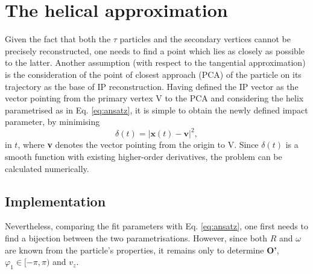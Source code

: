 \section{The helical approximation}
Given the fact that both the $\tau$ particles and the secondary vertices cannot be precisely reconstructed, one needs to find a point which lies as closely as possible to the latter. Another assumption (with respect to the tangential approximation) is the consideration of the point of closest approach (PCA) of the particle on its trajectory as the base of IP reconstruction. Having defined the IP vector as the vector pointing from the primary vertex V to the PCA and considering the helix parametrised as in Eq. \ref{eq:ansatz}, it is simple to obtain the newly defined impact parameter, by minimising
\begin{equation}
	\delta(t) = |\boldsymbol{x}(t)-\boldsymbol{v}|^2,
\end{equation}
in $t$, where \textbf{v} denotes the vector pointing from the origin to V. Since $\delta(t)$ is a smooth function with existing higher-order derivatives, the problem can be  calculated numerically.
\subsection{Implementation}
Nevertheless, comparing the fit parameters with Eq. \ref{eq:ansatz}, one first needs to find a bijection between the two parametrisations. However, since both $R$ and $\omega$ are known from the particle's properties, it remains only to determine \textbf{O'}, $\varphi_1 \in [-\pi,\pi)$ and $v_z$.
